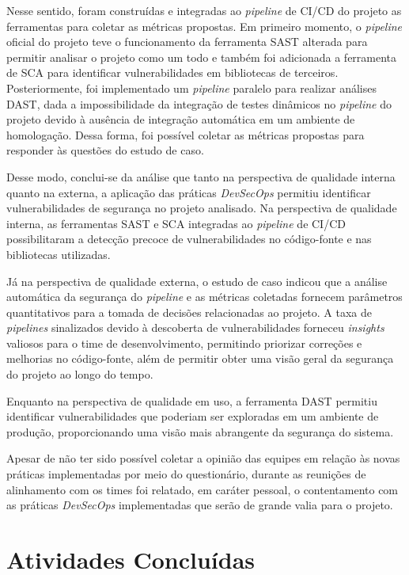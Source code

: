 Nesse sentido, foram construídas e integradas ao \textit{pipeline} de CI/CD do projeto as ferramentas para coletar as métricas propostas. Em primeiro momento, o \textit{pipeline} oficial do projeto teve o funcionamento da ferramenta SAST alterada para permitir analisar o projeto como um todo e também foi adicionada a ferramenta de SCA para identificar vulnerabilidades em bibliotecas de terceiros. Posteriormente, foi implementado um \textit{pipeline} paralelo para realizar análises DAST, dada a impossibilidade da integração de testes dinâmicos no \textit{pipeline} do projeto devido à ausência de integração automática em um ambiente de homologação. Dessa forma, foi possível coletar as métricas propostas para responder às questões do estudo de caso.

Desse modo, conclui-se da análise que tanto na perspectiva de qualidade interna quanto na externa, a aplicação das práticas \textit{DevSecOps} permitiu identificar vulnerabilidades de segurança no projeto analisado. Na perspectiva de qualidade interna, as ferramentas SAST e SCA integradas ao \textit{pipeline} de CI/CD possibilitaram a detecção precoce de vulnerabilidades no código-fonte e nas bibliotecas utilizadas. 

Já na perspectiva de qualidade externa, o estudo de caso indicou que a análise automática da segurança do \textit{pipeline} e as métricas coletadas fornecem parâmetros quantitativos para a tomada de decisões relacionadas ao projeto. A taxa de \textit{pipelines} sinalizados devido à descoberta de vulnerabilidades forneceu \textit{insights} valiosos para o time de desenvolvimento, permitindo priorizar correções e melhorias no código-fonte, além de permitir obter uma visão geral da segurança do projeto ao longo do tempo. 

Enquanto na perspectiva de qualidade em uso, a ferramenta DAST permitiu identificar vulnerabilidades que poderiam ser exploradas em um ambiente de produção, proporcionando uma visão mais abrangente da segurança do sistema.

Apesar de não ter sido possível coletar a opinião das equipes em relação às novas práticas implementadas por meio do questionário, durante as reunições de alinhamento com os times foi relatado, em caráter pessoal, o contentamento com as práticas \textit{DevSecOps} implementadas que serão de grande valia para o projeto.

\section{Atividades Concluídas}

